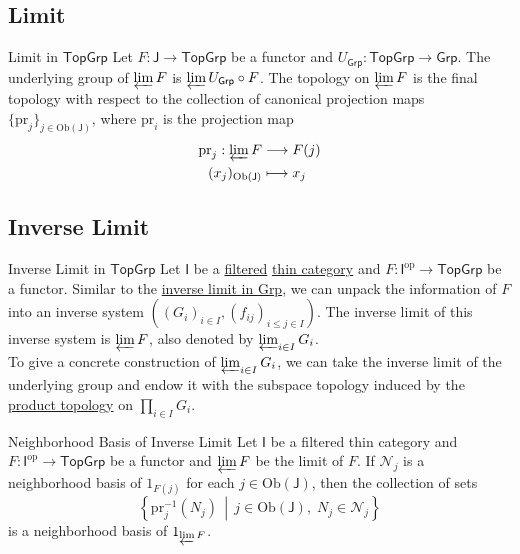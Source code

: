 \documentclass{report}
\newcommand{\midv}{\,\middle\vert\,}
\begin{document}
\subsection{Limit}
\begin{definition}{Limit in $\mathsf{TopGrp}$}{}
	Let $F:\mathsf{J}\to \mathsf{TopGrp}$ be a functor and $U_{\mathsf{Grp}}:\mathsf{TopGrp}\to \mathsf{Grp}$. The underlying group of $\varprojlim F$ is $\varprojlim  U_{\mathsf{Grp}}\circ F$. The topology on $\varprojlim F$ is the final topology with respect to the collection of canonical projection maps $\{\mathrm{pr}_j\}_{j\in\mathrm{Ob}\left(\mathsf{J}\right)}$,  where $\mathrm{pr}_i$ is the projection map
	\begin{align*}
		\mathrm{pr}_j:\varprojlim F & \longrightarrow F(j) \\
		(x_j)_{\mathrm{Ob}\left(\mathsf{J}\right)}  & \longmapsto x_j
	\end{align*}
\end{definition}



\subsection{Inverse Limit}
\begin{definition}{Inverse Limit in $\mathsf{TopGrp}$}{}
	Let $\mathsf{I}$ be a \hyperref[th:filtered_category]{filtered} \hyperref[th:thin_category]{thin category} and $F:\mathsf{I}^{\mathrm{op}}\to \mathsf{TopGrp}$ be a functor. Similar to the \hyperref[th:inverse_limit_of_groups]{inverse limit in \textsf{Grp}}, we can unpack the information of $F$ into an inverse system $\left(\left(G_i\right)_{i \in I},\left(f_{i j}\right)_{i \leq j \in I}\right)$. The inverse limit of this inverse system is $\varprojlim F$, also denoted by $\varprojlim_{i\in I}G_i$.\\
	To give a concrete construction of $\varprojlim_{i\in I}G_i$, we can take the inverse limit of the underlying group and endow it with the subspace topology induced by the \hyperref[th:product_topology]{product topology} on $\prod\limits_{i\in I}G_i$.
\end{definition}

\begin{proposition}{Neighborhood Basis of Inverse Limit}{}
	Let $\mathsf{I}$ be a filtered thin category and $F:\mathsf{I}^{\mathrm{op}}\to \mathsf{TopGrp}$ be a functor and $\varprojlim F$ be the limit of $F$. If $\mathcal{N}_j$ is a neighborhood basis of $1_{F(j)}$ for each $j\in \mathrm{Ob}\left(\mathsf{J}\right)$, then the collection of sets
	\[
		\left\{\mathrm{pr}_j^{-1}(N_j)\midv j\in \mathrm{Ob}\left(\mathsf{J}\right),\;N_j\in \mathcal{N}_j\right\}
	\]
	is a neighborhood basis of $1_{\varprojlim F}$.
\end{proposition}
\end{document}
